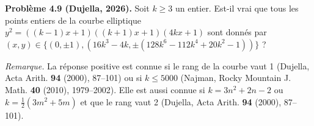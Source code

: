 \textbf{Problème 4.9 (Dujella, 2026).} Soit $k \geqslant 3$ un entier. Est-il vrai que tous les points entiers de la courbe elliptique $y^2=((k-1)x+1)((k+1)x+1)(4kx+1)$ sont donnés par $(x,y) \in \{(0,\pm 1),(16k^3-4k,\pm(128k^6-112k^4+20k^2-1))\}$ ?

\medskip

\textit{Remarque.} La réponse positive est connue si le rang de la courbe vaut 1 (Dujella, Acta Arith. \textbf{94} (2000), 87--101) ou si $k \leqslant 5000$ (Najman, Rocky Mountain J. Math. \textbf{40} (2010), 1979--2002). Elle est aussi connue si $k=3n^2+2n-2$ ou $k=\frac{1}{2}(3m^2+5m)$ et que le rang vaut 2 (Dujella, Acta Arith. \textbf{94} (2000), 87--101).
